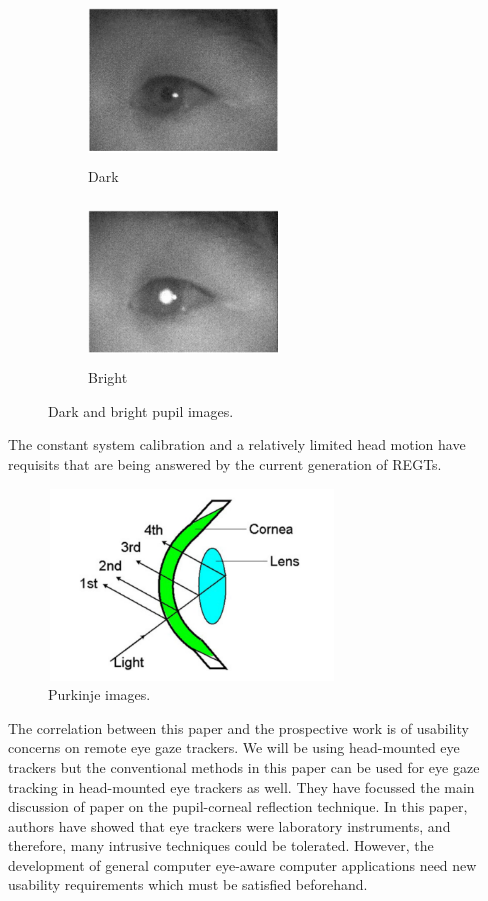 \begin{figure}[!hbt]
  \begin{subfigure}{.5\textwidth}
    \centering
    \includegraphics[width=2in,height=1.7in]{carlos.png}
    \caption{Dark}
    \label{carlos1}
  \end{subfigure}
  \begin{subfigure}{.5\textwidth}
    \centering
    \includegraphics[width=2in,height=1.7in]{carlos2.png}
    \caption{Bright}
    \label{carlos2}
  \end{subfigure}
  \caption{Dark and bright pupil images.}
\end{figure}

The constant system calibration and a relatively limited head motion have requisits that are being answered by the current generation of REGTs.

\begin{figure}[!hbt]
  \centering
  \includegraphics[width=3in,height=2in]{carlos3.png}
  \caption{Purkinje images.}
  \label{carlos3}
\end{figure}

The correlation between this paper and the prospective work is of usability concerns on remote eye gaze trackers. We will be using head-mounted eye trackers but the conventional methods in this paper can be used for eye gaze tracking in head-mounted eye trackers as well. They have focussed the main discussion of paper on the pupil-corneal reflection technique. In this paper, authors have showed that eye trackers were laboratory instruments, and therefore, many intrusive techniques could be tolerated. However, the development of general computer eye-aware computer applications need new usability requirements which must be satisfied beforehand.

